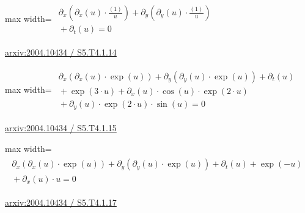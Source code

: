 \documentclass[UTF8,10pt,a4paper,fontset=mac]{ctexart}
\begin{document}
\begin{minipage}{\linewidth}\begin{center}\begin{adjustbox}{max width=\linewidth}$\displaystyle\begin{gathered}\begin{gathered}\partial_{x}(\partial_{x}(u)\cdot \frac{(1)}{u})+\partial_{y}(\partial_{y}(u)\cdot \frac{(1)}{u})\\[-1pt]{}+\partial_{t}(u)=0\end{gathered}\end{gathered}$\end{adjustbox}\end{center}{\small\href{https://arxiv.org/html/2004.10434#S5.T4.1.14}{arxiv:2004.10434 / S5.T4.1.14}}\par\end{minipage}\par\vspace{6mm}

\begin{minipage}{\linewidth}\begin{center}\begin{adjustbox}{max width=\linewidth}$\displaystyle\begin{gathered}\begin{gathered}\partial_{x}(\partial_{x}(u)\cdot \exp(u))+\partial_{y}(\partial_{y}(u)\cdot \exp(u))+\partial_{t}(u)\\[-1pt]{}+\exp(3\cdot u)+\partial_{x}(u)\cdot \cos(u)\cdot \exp(2\cdot u)\\[-1pt]{}+\partial_{y}(u)\cdot \exp(2\cdot u)\cdot \sin(u)=0\end{gathered}\end{gathered}$\end{adjustbox}\end{center}{\small\href{https://arxiv.org/html/2004.10434#S5.T4.1.15}{arxiv:2004.10434 / S5.T4.1.15}}\par\end{minipage}\par\vspace{6mm}

\begin{minipage}{\linewidth}\begin{center}\begin{adjustbox}{max width=\linewidth}$\displaystyle\begin{gathered}\begin{gathered}\partial_{x}(\partial_{x}(u)\cdot \exp(u))+\partial_{y}(\partial_{y}(u)\cdot \exp(u))+\partial_{t}(u)+\exp(-u)\\[-1pt]{}+\partial_{x}(u)\cdot u=0\end{gathered}\end{gathered}$\end{adjustbox}\end{center}{\small\href{https://arxiv.org/html/2004.10434#S5.T4.1.17}{arxiv:2004.10434 / S5.T4.1.17}}\par\end{minipage}\par\vspace{6mm}
\end{document}

